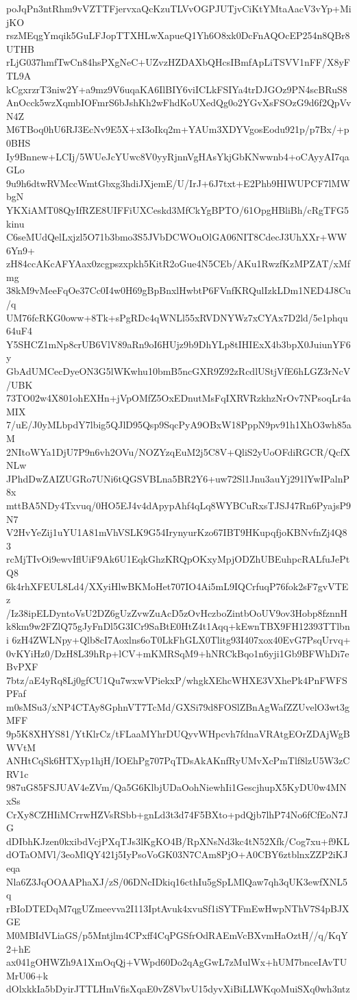 poJqPn3ntRhm9vVZTTFjervxaQcKzuTLVvOGPJUTjvCiKtYMtaAacV3vYp+MijKO
rszMEqgYmqik5GuLFJopTTXHLwXapueQ1Yh6O8xk0DcFnAQOcEP254n8QBr8UTHB
rLjG037hmfTwCn84hsPXgNeC+UZvzHZDAXbQHcsIBmfApLiTSVV1nFF/X8yFTL9A
kCgxrzrT3niw2Y+a9mz9V6uqaKA6IlBIY6viICLkFSIYa4trDJGOz9PN4scBRuS8
AnOcck5wzXqmbIOFmrS6bJshKh2wFhdKoUXedQg0o2YGvXsFSOzG9d6f2QpVvN4Z
M6TBoq0hU6RJ3EcNv9E5X+xI3oIkq2m+YAUm3XDYVgosEodu921p/p7Bx/+p0BHS
Iy9Bnnew+LCIj/5WUeJcYUwc8V0yyRjnnVgHAsYkjGbKNwwnb4+oCAyyAI7qaGLo
9u9h6dtwRVMccWmtGbxg3hdiJXjemE/U/IrJ+6J7txt+E2Phb9HIWUPCF7lMWbgN
YKXiAMT08QyIfRZE8UIFFiUXCeskd3MfCkYgBPTO/61OpgHBliBh/cRgTFG5kinu
C6seMUdQelLxjzl5O71b3bmo3S5JVbDCWOuOlGA06NIT8CdecJ3UhXXr+WW6Yn9+
zH84ccAKcAFYAax0zcgpszxpkh5KitR2oGue4N5CEb/AKu1RwzfKzMPZAT/xMfmg
38kM9vMeeFqOe37Cc0I4w0H69gBpBnxlHwbtP6FVnfKRQulIzkLDm1NED4J8Cu/q
UM76fcRKG0oww+8Tk+sPgRDc4qWNLl55xRVDNYWz7xCYAx7D2ld/5e1phqu64uF4
Y5SHCZ1mNp8crUB6VlV89aRn9oI6HUjz9b9DhYLp8tIHIExX4b3bpX0JuiunYF6y
GbAdUMCecDyeON3G5lWKwhu10bmB5ncGXR9Z92zRcdlUStjVfE6hLGZ3rNcV/UBK
73TO02w4X801ohEXHn+jVpOMfZ5OxEDnutMsFqIXRVRzkhzNrOv7NPsoqLr4aMIX
7/uE/J0yMLbpdY7lbig5QJlD95Qsp9SqcPyA9OBxW18PppN9pv91h1XhO3wh85aM
2NItoWYa1DjU7P9n6vh2OVu/NOZYzqEuM2j5C8V+QliS2yUoOFdiRGCR/QcfXNLw
JPhdDwZAIZUGRo7UNi6tQGSVBLna5BR2Y6+uw72Sl1Jnu3auYj291lYwIPalnP8x
mttBA5NDy4Txvuq/0HO5EJ4v4dApypAhf4qLq8WYBCuRxsTJSJ47Rn6PyajsP9N7
V2HvYeZij1uYU1A81mVhVSLK9G54IrynyurKzo67IBT9HKupqfjoKBNvfnZj4Q83
rcMjTIvOi9ewvIflUiF9Ak6U1EqkGhzKRQpOKxyMpjODZhUBEuhpcRALfuJePtQ8
6k4rhXFEUL8Ld4/XXyiHlwBKMoHet707IO4Ai5mL9IQCrfuqP76fok2sF7gvVTEz
/Iz38ipELDyntoVsU2DZ6gUzZvwZuAcD5zOvHczboZintbOoUV9ov3Hobp8fznnH
k8km9w2FZlQ75gJyFnDl5G3ICr9SaBtE0HtZ4t1Aqq+kEwnTBX9FH12393TTlbni
6zH4ZWLNpy+Qlb8cI7Aoxlns6oT0LkFhGLX0Tlitg93I407xox40EvG7PsqUrvq+
0vKYiHz0/DzH8L39hRp+lCV+mKMRSqM9+hNRCkBqo1n6yji1Gb9BFWhDi7eBvPXF
7btz/aE4yRq8Lj0gfCU1Qu7wxwVPiekxP/whgkXEhcWHXE3VXhePk4PnFWFSPFaf
m0sMSu3/xNP4CTAy8GphnVT7TcMd/GXSi79d8FOSlZBnAgWafZZUvelO3wt3gMFF
9p5K8XHYS81/YtKlrCz/tFLaaMYhrDUQyvWHpcvh7fdnaVRAtgEOrZDAjWgBWVtM
ANHtCqSk6HTXyp1hjH/IOEhPg707PqTDsAkAKnfRyUMvXcPmTlf8lzU5W3zCRV1c
987uG85FSJUAV4eZVm/Qa5G6KlbjUDaOohNiewhIi1GescjhupX5KyDU0w4MNxSs
CrXy8CZHIiMCrrwHZVsRSbb+gnLd3t3d74F5BXto+pdQjb7lhP74No6fCfEoN7JG
dDIbhKJzen0kxibdVcjPXqTJs3lKgKO4B/RpXNsNd3kc4tN52Xfk/Cog7xu+f9KL
dOTaOMVl/3eoMlQY421j5IyPsoVoGK03N7CAm8PjO+A0CBY6ztblnxZZP2iKJeqa
Nla6Z3JqOOAAPhaXJ/zS/06DNcIDkiq16cthIu5gSpLMlQaw7qh3qUK3ewfXNL5q
rBIoDTEDqM7qgUZmeevva2I113IptAvuk4xvuSf1iSYTFmEwHwpNThV7S4pBJXGE
M0MBIdVLiaGS/p5Mntjlm4CPxff4CqPGSfrOdRAEmVcBXvmHaOztH//q/KqY2+hE
ax041gOHWZh9A1XmOqQj+VWpd60Do2qAgGwL7zMulWx+hUM7bnceIAvTUMrU06+k
dOlxkkIa5bDyirJTTLHmVfisXqaE0vZ8VbvU15dyvXiBiLLWKqoMuiSXq0wh3ntz
